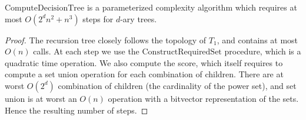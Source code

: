 			\begin{proposition}
				$\text{ComputeDecisionTree}$ is a parameterized complexity algorithm which requires at most $O(2^d n^2 + n^3)$ steps for $d$-ary trees.
				\label{prop:decisionTreeComplexity}
			\end{proposition}
			\begin{proof}
				The recursion tree closely follows the topology of $T_1$, and contains at most $O(n)$ calls.
				At each step we use the $\text{ConstructRequiredSet}$ procedure, which is a quadratic time operation.
				We also compute the score, which itself requires to compute a set union operation for each combination of children.
				There are at worst $O(2^d)$ combination of children (the cardinality of the power set), and set union is at worst an $O(n)$ operation with a bitvector representation of the sets.
				Hence the resulting number of steps.
			\end{proof}

%
%			
%
%

